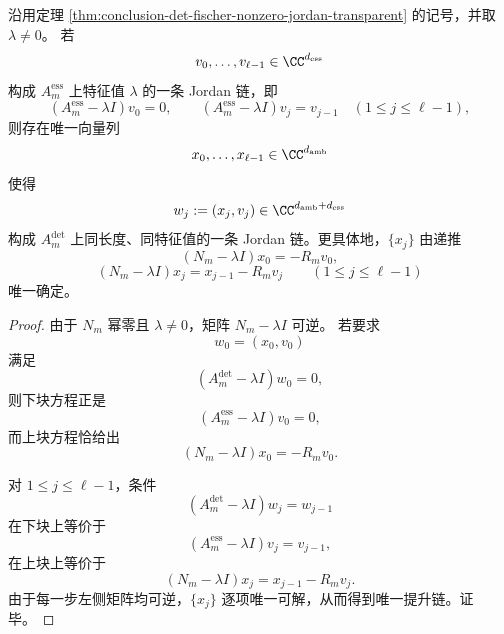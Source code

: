 \begin{theorem}\label{thm:conclusion-ambiguity-shell-nonzero-jordan-chain-graph-lift}
沿用定理 \ref{thm:conclusion-det-fischer-nonzero-jordan-transparent} 的记号，并取 \(\lambda\neq 0\)。
若
\[
v_0,\dots,v_{\ell-1}\in \CC^{d_{\mathrm{ess}}}
\]
构成 \(A_m^{\mathrm{ess}}\) 上特征值 \(\lambda\) 的一条 Jordan 链，即
\[
(A_m^{\mathrm{ess}}-\lambda I)v_0=0,
\qquad
(A_m^{\mathrm{ess}}-\lambda I)v_j=v_{j-1}
\quad(1\le j\le \ell-1),
\]
则存在唯一向量列
\[
x_0,\dots,x_{\ell-1}\in \CC^{d_{\mathrm{amb}}}
\]
使得
\[
w_j:=(x_j,v_j)\in \CC^{d_{\mathrm{amb}}+d_{\mathrm{ess}}}
\]
构成 \(A_m^{\mathrm{det}}\) 上同长度、同特征值的一条 Jordan 链。更具体地，\(\{x_j\}\) 由递推
\[
(N_m-\lambda I)x_0=-R_m v_0,
\]
\[
(N_m-\lambda I)x_j=x_{j-1}-R_m v_j
\qquad(1\le j\le \ell-1)
\]
唯一确定。
\end{theorem}
\begin{proof}
由于 \(N_m\) 幂零且 \(\lambda\neq 0\)，矩阵 \(N_m-\lambda I\) 可逆。
若要求
\[
w_0=(x_0,v_0)
\]
满足
\[
(A_m^{\mathrm{det}}-\lambda I)w_0=0,
\]
则下块方程正是
\[
(A_m^{\mathrm{ess}}-\lambda I)v_0=0,
\]
而上块方程恰给出
\[
(N_m-\lambda I)x_0=-R_m v_0.
\]

对 \(1\le j\le \ell-1\)，条件
\[
(A_m^{\mathrm{det}}-\lambda I)w_j=w_{j-1}
\]
在下块上等价于
\[
(A_m^{\mathrm{ess}}-\lambda I)v_j=v_{j-1},
\]
在上块上等价于
\[
(N_m-\lambda I)x_j=x_{j-1}-R_m v_j.
\]
由于每一步左侧矩阵均可逆，\(\{x_j\}\) 逐项唯一可解，从而得到唯一提升链。证毕。
\end{proof}

